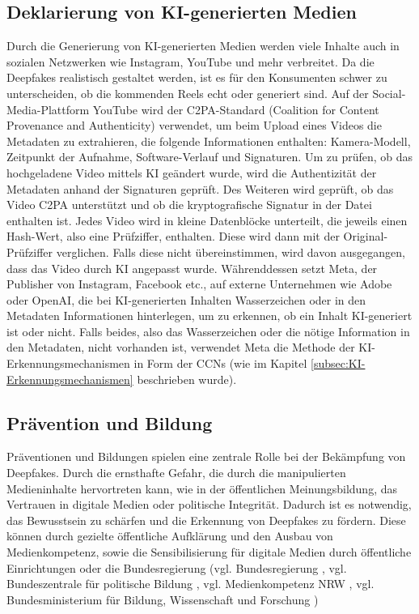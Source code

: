 \documentclass[a4paper,12pt]{article}
\begin{document}
\subsection{Deklarierung von KI-generierten Medien}
Durch die Generierung von KI-generierten Medien werden viele Inhalte auch in sozialen Netzwerken wie Instagram, 
YouTube und mehr verbreitet. 
Da die Deepfakes realistisch gestaltet werden, 
ist es für den Konsumenten schwer zu unterscheiden, 
ob die kommenden Reels echt oder generiert sind.
Auf der Social-Media-Plattform YouTube wird der C2PA-Standard (Coalition for Content Provenance and Authenticity) verwendet, 
um beim Upload eines Videos die Metadaten zu extrahieren, 
die folgende Informationen enthalten: Kamera-Modell, 
Zeitpunkt der Aufnahme, Software-Verlauf und Signaturen. 
Um zu prüfen, ob das hochgeladene Video mittels KI geändert wurde, 
wird die Authentizität der Metadaten anhand der Signaturen geprüft. 
Des Weiteren wird geprüft, ob das Video C2PA unterstützt und ob die kryptografische Signatur in der Datei enthalten ist.
Jedes Video wird in kleine Datenblöcke unterteilt, 
die jeweils einen Hash-Wert, also eine Prüfziffer, 
enthalten. Diese wird dann mit der Original-Prüfziffer verglichen. 
Falls diese nicht übereinstimmen, wird davon ausgegangen, 
dass das Video durch KI angepasst wurde.\cite{TheVerge2024a}
Währenddessen setzt Meta, der Publisher von Instagram, Facebook etc., auf externe Unternehmen wie Adobe oder OpenAI,
die bei KI-generierten Inhalten Wasserzeichen oder in den Metadaten Informationen hinterlegen,
um zu erkennen, ob ein Inhalt KI-generiert ist oder nicht. Falls beides,
also das Wasserzeichen oder die nötige Information in den Metadaten,
nicht vorhanden ist, verwendet Meta die Methode der KI-Erkennungsmechanismen in Form der CCNs (wie im Kapitel \ref{subsec:KI-Erkennungsmechanismen} beschrieben wurde).\cite{TheVerge2024b}\cite{Meta2024}

\subsection{Prävention und Bildung}
Präventionen und Bildungen spielen eine zentrale Rolle bei der Bekämpfung von Deepfakes.
Durch die ernsthafte Gefahr, die durch die manipulierten Medieninhalte hervortreten kann,
wie in der öffentlichen Meinungsbildung, das Vertrauen in digitale Medien oder politische Integrität.
Dadurch ist es notwendig, das Bewusstsein zu schärfen und die Erkennung von Deepfakes zu fördern.
Diese können durch gezielte öffentliche Aufklärung und den Ausbau von Medienkompetenz,
sowie die Sensibilisierung für digitale Medien durch öffentliche Einrichtungen oder die Bundesregierung 
(vgl. Bundesregierung \cite{Bundesregierung2024}, vgl. Bundeszentrale für politische Bildung \cite{BPB2024}, vgl. Medienkompetenz NRW \cite{Medienkompetenz2024},
vgl. Bundesministerium für Bildung, Wissenschaft und Forschung \cite{Erwachsenenbildung2024})
\end{document}
